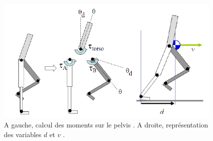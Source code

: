 \documentclass[runningheads,a4paper]{llncs}
\begin{document}
\begin{figure}[h]
\centering
\includegraphics[scale=0.5]{stance_torque_and_v_and_d.png}
\caption{A gauche, calcul des moments sur le pelvis \cite{yin2007simbicon}. A droite, représentation des variables \(d\) et \(v\) \cite{yin2007simbicon}.}
\label{fig:torques_pelvis}
\label{fig:d_and_v}
\end{figure}

\label{sec:jacob}
\end{document}
